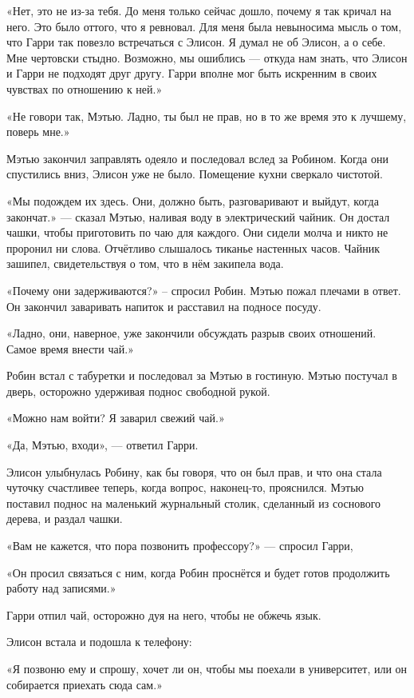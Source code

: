 \documentclass[a5paper, 9pt,
final, openany, twoside=true]{memoir}
\begin{document}
«Нет, это не из-за тебя. До меня только сейчас дошло, почему я так кричал на него. Это было оттого, что я ревновал. Для меня была невыносима мысль о том, что Гарри так повезло встречаться с Элисон. Я думал не об Элисон, а о себе. Мне чертовски стыдно. Возможно, мы ошиблись — откуда нам знать, что Элисон и Гарри не подходят друг другу. Гарри вполне мог быть искренним в своих чувствах по отношению к ней.»

«Не говори так, Мэтью. Ладно, ты был не прав, но в то же время это к лучшему, поверь мне.»\bigskip

Мэтью закончил заправлять одеяло и последовал вслед за Робином. Когда они спустились вниз, Элисон уже не было. Помещение кухни сверкало чистотой.

«Мы подождем их здесь. Они, должно быть, разговаривают и выйдут, когда закончат.» — сказал Мэтью, наливая воду в электрический чайник. Он достал чашки, чтобы приготовить по чаю для каждого. Они сидели молча и никто не проронил ни слова. Отчётливо слышалось тиканье настенных часов. Чайник зашипел, свидетельствуя о том, что в нём закипела вода.

«Почему они задерживаются?» – спросил Робин. Мэтью пожал плечами в ответ. Он закончил заваривать напиток и расставил на подносе посуду.

«Ладно, они, наверное, уже закончили обсуждать разрыв своих отношений. Самое время внести чай.»

Робин встал с табуретки и последовал за Мэтью в гостиную. Мэтью постучал в дверь, осторожно удерживая поднос свободной рукой.

«Можно нам войти? Я заварил свежий чай.»

«Да, Мэтью, входи», — ответил Гарри.

Элисон улыбнулась Робину, как бы говоря, что он был прав, и что она стала чуточку счастливее теперь, когда вопрос, наконец-то, прояснился. Мэтью поставил поднос на маленький журнальный столик, сделанный из соснового дерева, и раздал чашки.

«Вам не кажется, что пора позвонить профессору?» — спросил Гарри,

«Он просил связаться с ним, когда Робин проснётся и будет готов продолжить работу над записями.»

Гарри отпил чай, осторожно дуя на него, чтобы не обжечь язык.

Элисон встала и подошла к телефону:

«Я позвоню ему и спрошу, хочет ли он, чтобы мы поехали в университет, или он собирается приехать сюда сам.»\bigskip
\end{document}
